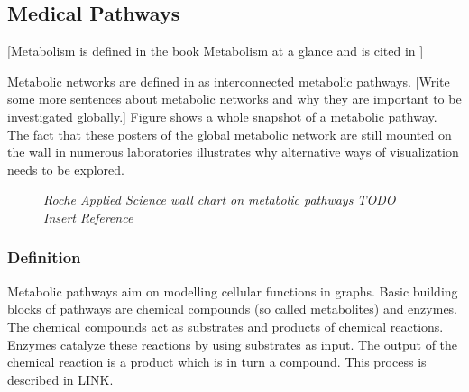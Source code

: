 \subsection{Medical Pathways}

[Metabolism is defined in the book Metabolism at a glance and is cited in \citep{Bourqui2006}]

Metabolic networks are defined in \citep{Bourqui2006} as interconnected metabolic pathways.
[Write some more sentences about metabolic networks and why they are important to be investigated globally.]
Figure  shows a whole snapshot of a metabolic pathway. The fact that these posters of the global metabolic network are still mounted on the wall in numerous laboratories illustrates why alternative ways of visualization needs to be explored. 

\begin{figure}[ht]
\centering
{} 
\caption[Roche Applied Science wall chart on metabolic pathways]{\textit{Roche Applied Science wall chart on metabolic pathways TODO Insert Reference}} 
\label{gfx:RocheAppliedScience_MetabolicPathways_WallChart}
\end{figure}

\subsubsection{Definition}

Metabolic pathways aim on modelling cellular functions in graphs. Basic building blocks of pathways are chemical compounds (so called metabolites) and enzymes. The chemical compounds act as substrates and products of chemical reactions. Enzymes catalyze these reactions by using substrates as input. The output of the chemical reaction is a product which is in turn a compound. This process is described in LINK. 

